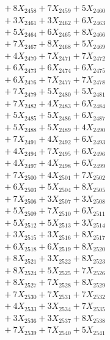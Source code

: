 \documentclass[a4paper,10pt]{article}
\begin{document}
{\begin{align}
&\;  + 8 X_{2458} + 7 X_{2459} + 5 X_{2460} \\[0.3ex]
&\;  + 3 X_{2461} + 3 X_{2462} + 6 X_{2463} \\[0.3ex]
&\;  + 5 X_{2464} + 6 X_{2465} + 8 X_{2466} \\[0.3ex]
&\;  + 7 X_{2467} + 8 X_{2468} + 5 X_{2469} \\[0.5ex]\allowbreak
&\;  + 4 X_{2470} + 7 X_{2471} + 7 X_{2472} \\[0.3ex]
&\;  + 6 X_{2473} + 6 X_{2474} + 6 X_{2475} \\[0.3ex]
&\;  + 6 X_{2476} + 7 X_{2477} + 7 X_{2478} \\[0.3ex]
&\;  + 7 X_{2479} + 5 X_{2480} + 5 X_{2481} \\[0.3ex]
&\;  + 7 X_{2482} + 4 X_{2483} + 6 X_{2484} \\[0.3ex]
&\;  + 5 X_{2485} + 5 X_{2486} + 6 X_{2487} \\[0.3ex]
&\;  + 5 X_{2488} + 5 X_{2489} + 4 X_{2490} \\[0.3ex]
&\;  + 7 X_{2491} + 4 X_{2492} + 6 X_{2493} \\[0.3ex]
&\;  + 4 X_{2494} + 7 X_{2495} + 6 X_{2496} \\[0.3ex]
&\;  + 4 X_{2497} + 4 X_{2498} + 6 X_{2499} \\[0.5ex]\allowbreak
&\;  + 7 X_{2500} + 4 X_{2501} + 7 X_{2502} \\[0.3ex]
&\;  + 6 X_{2503} + 5 X_{2504} + 8 X_{2505} \\[0.3ex]
&\;  + 7 X_{2506} + 3 X_{2507} + 3 X_{2508} \\[0.3ex]
&\;  + 5 X_{2509} + 7 X_{2510} + 6 X_{2511} \\[0.3ex]
&\;  + 5 X_{2512} + 5 X_{2513} + 3 X_{2514} \\[0.3ex]
&\;  + 3 X_{2515} + 3 X_{2516} + 8 X_{2517} \\[0.3ex]
&\;  + 6 X_{2518} + 6 X_{2519} + 8 X_{2520} \\[0.3ex]
&\;  + 8 X_{2521} + 3 X_{2522} + 8 X_{2523} \\[0.3ex]
&\;  + 8 X_{2524} + 5 X_{2525} + 7 X_{2526} \\[0.3ex]
&\;  + 8 X_{2527} + 7 X_{2528} + 8 X_{2529} \\[0.5ex]\allowbreak
&\;  + 7 X_{2530} + 7 X_{2531} + 7 X_{2532} \\[0.3ex]
&\;  + 4 X_{2533} + 3 X_{2534} + 7 X_{2535} \\[0.3ex]
&\;  + 3 X_{2536} + 3 X_{2537} + 8 X_{2538} \\[0.3ex]
&\;  + 7 X_{2539} + 7 X_{2540} + 5 X_{2541} \\[0.3ex]

\end{align}}
\end{document}
